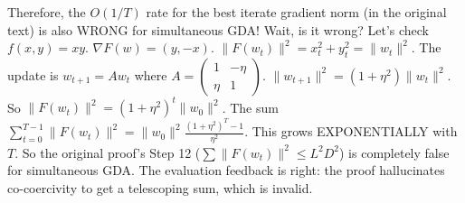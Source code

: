 \documentclass{article}
\begin{document}
Therefore, the $O(1/T)$ rate for the best iterate gradient norm (in the original text) is also WRONG for simultaneous GDA!
Wait, is it wrong?
Let's check $f(x,y) = xy$. $\nabla F(w) = (y, -x)$. $\|F(w_t)\|^2 = x_t^2 + y_t^2 = \|w_t\|^2$.
The update is $w_{t+1} = A w_t$ where $A = \begin{pmatrix} 1 & -\eta \\ \eta & 1 \end{pmatrix}$.
$\|w_{t+1}\|^2 = (1+\eta^2) \|w_t\|^2$.
So $\|F(w_t)\|^2 = (1+\eta^2)^t \|w_0\|^2$.
The sum $\sum_{t=0}^{T-1} \|F(w_t)\|^2 = \|w_0\|^2 \frac{(1+\eta^2)^T - 1}{\eta^2}$.
This grows EXPONENTIALLY with $T$.
So the original proof's Step 12 ($\sum \|F(w_t)\|^2 \leq L^2 D^2$) is completely false for simultaneous GDA.
The evaluation feedback is right: the proof hallucinates co-coercivity to get a telescoping sum, which is invalid.
\end{document}
